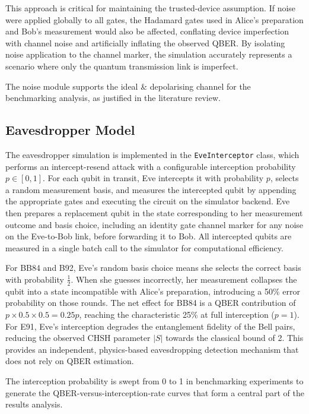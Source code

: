 \documentclass[10pt, a4paper]{report}
\begin{document}
This approach is critical for maintaining the trusted-device assumption. If noise were applied globally to all gates, the Hadamard gates used in Alice's preparation and Bob's measurement would also be affected, conflating device imperfection with channel noise and artificially inflating the observed QBER. By isolating noise application to the channel marker, the simulation accurately represents a scenario where only the quantum transmission link is imperfect.

The noise module supports the ideal \& depolarising channel for the benchmarking analysis, as justified in the literature review.

\subsection{Eavesdropper Model}

The eavesdropper simulation is implemented in the \texttt{EveInterceptor} class, which performs an intercept-resend attack with a configurable interception probability $p \in [0, 1]$. For each qubit in transit, Eve intercepts it with probability $p$, selects a random measurement basis, and measures the intercepted qubit by appending the appropriate gates and executing the circuit on the simulator backend. Eve then prepares a replacement qubit in the state corresponding to her measurement outcome and basis choice, including an identity gate channel marker for any noise on the Eve-to-Bob link, before forwarding it to Bob. All intercepted qubits are measured in a single batch call to the simulator for computational efficiency.

For BB84 and B92, Eve's random basis choice means she selects the correct basis with probability $\frac{1}{2}$. When she guesses incorrectly, her measurement collapses the qubit into a state incompatible with Alice's preparation, introducing a 50\% error probability on those rounds. The net effect for BB84 is a QBER contribution of $p \times 0.5 \times 0.5 = 0.25p$, reaching the characteristic 25\% at full interception ($p = 1$). For E91, Eve's interception degrades the entanglement fidelity of the Bell pairs, reducing the observed CHSH parameter $|S|$ towards the classical bound of 2. This provides an independent, physics-based eavesdropping detection mechanism that does not rely on QBER estimation.

The interception probability is swept from 0 to 1 in benchmarking experiments to generate the QBER-versus-interception-rate curves that form a central part of the results analysis.
\end{document}
